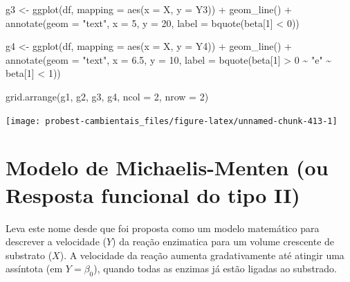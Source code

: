 \documentclass[
]{book}
\newenvironment{Shaded}{\begin{snugshade}}{\end{snugshade}}
\newcommand{\AttributeTok}[1]{\textcolor[rgb]{0.77,0.63,0.00}{#1}}
\newcommand{\DecValTok}[1]{\textcolor[rgb]{0.00,0.00,0.81}{#1}}
\newcommand{\FloatTok}[1]{\textcolor[rgb]{0.00,0.00,0.81}{#1}}
\newcommand{\FunctionTok}[1]{\textcolor[rgb]{0.00,0.00,0.00}{#1}}
\newcommand{\NormalTok}[1]{#1}
\newcommand{\OtherTok}[1]{\textcolor[rgb]{0.56,0.35,0.01}{#1}}
\newcommand{\SpecialCharTok}[1]{\textcolor[rgb]{0.00,0.00,0.00}{#1}}
\newcommand{\StringTok}[1]{\textcolor[rgb]{0.31,0.60,0.02}{#1}}
\begin{document}
\begin{Shaded}
\begin{Highlighting}[]
\NormalTok{g3 }\OtherTok{\textless{}{-}} \FunctionTok{ggplot}\NormalTok{(df, }\AttributeTok{mapping =} \FunctionTok{aes}\NormalTok{(}\AttributeTok{x =}\NormalTok{ X, }\AttributeTok{y =}\NormalTok{ Y3)) }\SpecialCharTok{+}
  \FunctionTok{geom\_line}\NormalTok{() }\SpecialCharTok{+}
  \FunctionTok{annotate}\NormalTok{(}\AttributeTok{geom =} \StringTok{"text"}\NormalTok{, }\AttributeTok{x =} \DecValTok{5}\NormalTok{, }\AttributeTok{y =} \DecValTok{20}\NormalTok{, }
           \AttributeTok{label =} \FunctionTok{bquote}\NormalTok{(beta[}\DecValTok{1}\NormalTok{] }\SpecialCharTok{\textless{}} \DecValTok{0}\NormalTok{))}

\NormalTok{g4 }\OtherTok{\textless{}{-}} \FunctionTok{ggplot}\NormalTok{(df, }\AttributeTok{mapping =} \FunctionTok{aes}\NormalTok{(}\AttributeTok{x =}\NormalTok{ X, }\AttributeTok{y =}\NormalTok{ Y4)) }\SpecialCharTok{+}
  \FunctionTok{geom\_line}\NormalTok{() }\SpecialCharTok{+}
  \FunctionTok{annotate}\NormalTok{(}\AttributeTok{geom =} \StringTok{"text"}\NormalTok{, }\AttributeTok{x =} \FloatTok{6.5}\NormalTok{, }\AttributeTok{y =} \DecValTok{10}\NormalTok{, }
           \AttributeTok{label =} \FunctionTok{bquote}\NormalTok{(beta[}\DecValTok{1}\NormalTok{] }\SpecialCharTok{\textgreater{}} \DecValTok{0} \SpecialCharTok{\textasciitilde{}} \StringTok{"e"} \SpecialCharTok{\textasciitilde{}}\NormalTok{ beta[}\DecValTok{1}\NormalTok{] }\SpecialCharTok{\textless{}} \DecValTok{1}\NormalTok{))}

\FunctionTok{grid.arrange}\NormalTok{(g1, g2, g3, g4, }\AttributeTok{ncol =} \DecValTok{2}\NormalTok{, }\AttributeTok{nrow =} \DecValTok{2}\NormalTok{)}
\end{Highlighting}
\end{Shaded}

\begin{center}\texttt{[image: probest-cambientais\_files/figure-latex/unnamed-chunk-413-1]} \end{center}

\hypertarget{modelo-de-michaelis-menten-ou-resposta-funcional-do-tipo-ii}{%
\section{Modelo de Michaelis-Menten (ou Resposta funcional do tipo II)}\label{modelo-de-michaelis-menten-ou-resposta-funcional-do-tipo-ii}}

Leva este nome desde que foi proposta como um modelo matemático para descrever a velocidade (\(Y\)) da reação enzimatica para um volume crescente de substrato (\(X\)). A velocidade da reação aumenta gradativamente até atingir uma assíntota (em \(Y = \beta_0\)), quando todas as enzimas já estão ligadas ao substrado.
\end{document}
